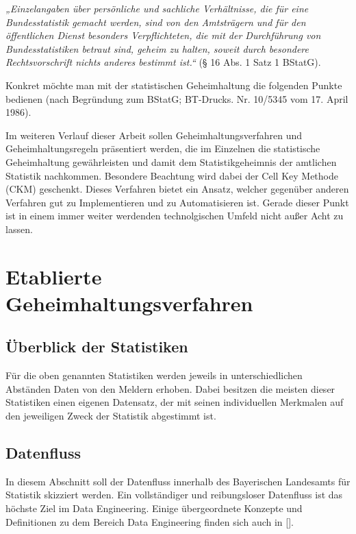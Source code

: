 \textit{„Einzelangaben über persönliche und sachliche Verhältnisse, die für eine Bundesstatistik gemacht werden, sind von den Amtsträgern und für den öffentlichen Dienst besonders Verpflichteten, die mit der Durchführung von Bundesstatistiken betraut sind, geheim zu halten, soweit durch besondere Rechtsvorschrift nichts anderes bestimmt ist.“} (§ 16 Abs. 1 Satz 1 BStatG).

Konkret möchte man mit der statistischen Geheimhaltung die folgenden Punkte bedienen (nach Begründung zum BStatG; BT-Drucks. Nr. 10/5345 vom 17. April 1986). 

Im weiteren Verlauf dieser Arbeit sollen Geheimhaltungsverfahren und Geheimhaltungsregeln präsentiert werden, die im Einzelnen die statistische Geheimhaltung gewährleisten und damit dem Statistikgeheimnis der amtlichen Statistik nachkommen. Besondere Beachtung wird dabei der Cell Key Methode (CKM) geschenkt. Dieses Verfahren bietet ein Ansatz, welcher gegenüber anderen Verfahren gut zu Implementieren und zu Automatisieren ist. Gerade dieser Punkt ist in einem immer weiter werdenden technolgischen Umfeld nicht außer Acht zu lassen.

\section{Etablierte Geheimhaltungsverfahren}%

\subsection{Überblick der Statistiken}%


Für die oben genannten Statistiken werden jeweils in unterschiedlichen Abständen Daten von den Meldern erhoben. Dabei besitzen die meisten dieser Statistiken einen eigenen Datensatz, der mit seinen individuellen Merkmalen auf den jeweiligen Zweck der Statistik abgestimmt ist. 

\subsection{Datenfluss}%

In diesem Abschnitt soll der Datenfluss innerhalb des Bayerischen Landesamts für Statistik skizziert werden. Ein vollständiger und reibungsloser Datenfluss ist das höchste Ziel im Data Engineering. Einige übergeordnete Konzepte und Definitionen zu dem Bereich Data Engineering finden sich auch in [\cite{cri20}].




